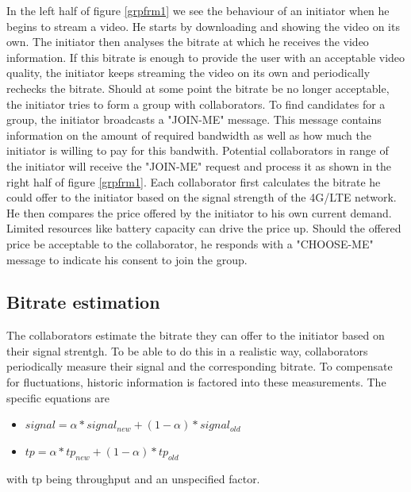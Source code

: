 In the left half of figure \ref{grpfrm1} we see the behaviour of an initiator when he begins to stream a video. He starts by downloading and showing the video on its own. The initiator then analyses the bitrate at which he receives the video information. If this bitrate is enough to provide the user with an acceptable video quality, the initiator keeps streaming the video on its own and periodically rechecks the bitrate. Should at some point the bitrate be no longer acceptable, the initiator tries to form a group with collaborators. To find candidates for a group, the initiator broadcasts a "JOIN-ME" message. This message contains information on the amount of required bandwidth as well as how much the initiator is willing to pay for this bandwith. Potential collaborators in range of the initiator will receive the "JOIN-ME" request and process it as shown in the right half of figure \ref{grpfrm1}. Each collaborator first calculates the bitrate he could offer to the initiator based on the signal strength of the 4G/LTE network. He then compares the price offered by the initiator to his own current demand. Limited resources like battery capacity can drive the price up. Should the offered price be acceptable to the collaborator, he responds with a "CHOOSE-ME" message to indicate his consent to join the group.

\subsection{Bitrate estimation}
The collaborators estimate the bitrate they can offer to the initiator based on their signal strentgh. To be able to do this in a realistic way, collaborators periodically measure their signal and the corresponding bitrate. To compensate for fluctuations, historic information is factored into these measurements. The specific equations are 
\begin{itemize}
\item $signal=\alpha * signal_{new}+(1-\alpha)* signal_{old}$
\item $tp=\alpha * tp_{new}+(1-\alpha)* tp_{old}$
\end{itemize} with tp being throughput and \alpha an unspecified factor.

